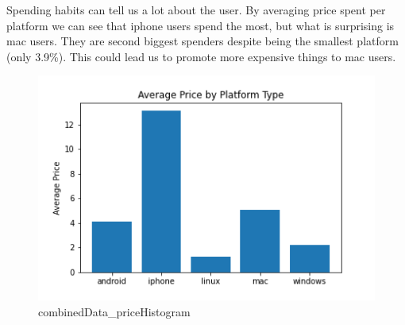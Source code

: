 Spending habits can tell us a lot about the user. By averaging price spent per platform we can see that iphone users spend the most, but what is surprising is mac users. They are second biggest spenders despite being the smallest platform (only 3.9\%). This could lead us to promote more expensive things to mac users.
\begin{figure}[H]
\includegraphics[scale=0.85]{img/Graphs/combinedData/priceHistogram_combinedData.png}
\centering
\caption{combinedData\_priceHistogram}
\label{fig:combinedData_priceHistogram}
\end{figure}
